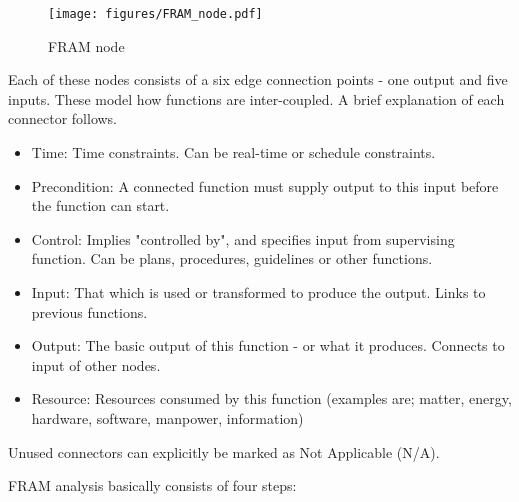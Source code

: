 \begin{figure}[h]
 \centering
   \texttt{[image: figures/FRAM\_node.pdf]}
 \caption{FRAM node}
 \label{fig:fram_node}
\end{figure}

Each of these nodes consists of a six edge connection points - one output and five inputs. These  model how functions are inter-coupled. A brief explanation of each connector follows.


\begin{itemize}
  \item Time: Time constraints. Can be real-time or schedule constraints.

  \item Precondition: A connected function must supply output to this input before the function can start.

  \item Control: Implies "controlled by", and specifies input from supervising function. Can be plans, procedures, guidelines or other functions.
  
  \item Input: That which is used or transformed to produce the output. Links to previous functions.

  \item Output: The basic output of this function - or what it produces. Connects to input of other nodes.
  \item Resource: Resources consumed by this function (examples are; matter, energy, hardware, software, manpower, information)
\end{itemize} 
Unused connectors can explicitly be marked as Not Applicable (N/A).



FRAM analysis basically consists of four steps:

